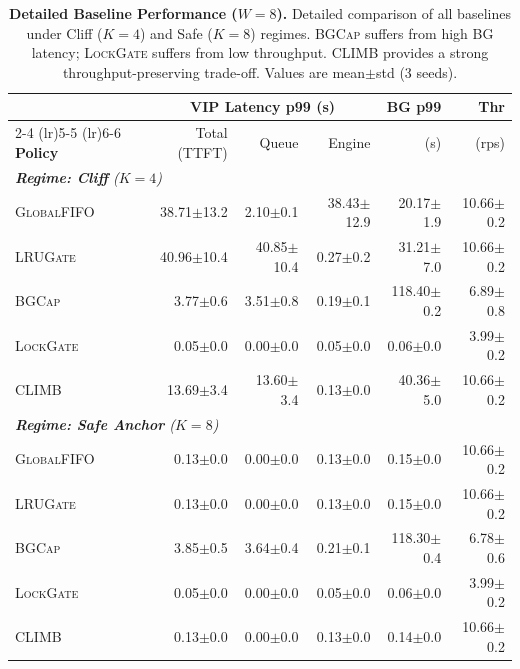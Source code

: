 \begin{table}[h] %
  \centering
  \small
  \setlength{\tabcolsep}{5pt} %
  \caption{\textbf{Detailed Baseline Performance ($W{=}8$).} 
  Detailed comparison of all baselines under Cliff ($K{=}4$) and Safe ($K{=}8$) regimes. 
  \textsc{BGCap} suffers from high \textsf{BG} latency; \textsc{LockGate} suffers from low throughput. 
  \textsc{CLIMB} provides a strong throughput-preserving trade-off. Values are mean$\pm$std (3 seeds).}
  \label{tab:baseline_zoo}
  \begin{tabular}{l rrr r r}
    \toprule
    & \multicolumn{3}{c}{\textbf{\textsf{VIP} Latency p99 (s)}} & \textbf{\textsf{BG} p99} & \textbf{Thr} \\
    \cmidrule(lr){2-4} \cmidrule(lr){5-5} \cmidrule(lr){6-6}
    \textbf{Policy} & Total (TTFT) & Queue & Engine & (s) & (rps) \\
    \midrule
    \multicolumn{6}{l}{\textit{\textbf{Regime: Cliff} ($K{=}4$)}} \\
    \textsc{GlobalFIFO}      & 38.71$\pm$13.2 &  2.10$\pm$0.1 & 38.43$\pm$12.9 &  20.17$\pm$1.9 & 10.66$\pm$0.2 \\
    \textsc{LRUGate} & 40.96$\pm$10.4 & 40.85$\pm$10.4&  0.27$\pm$0.2  &  31.21$\pm$7.0 & 10.66$\pm$0.2 \\
    \textsc{BGCap}    &  3.77$\pm$0.6  &  3.51$\pm$0.8 &  0.19$\pm$0.1  & 118.40$\pm$0.2 &  6.89$\pm$0.8 \\
    \textsc{LockGate}   &  0.05$\pm$0.0  &  0.00$\pm$0.0 &  0.05$\pm$0.0  &   0.06$\pm$0.0 &  3.99$\pm$0.2 \\
    \textsc{CLIMB}     & 13.69$\pm$3.4  & 13.60$\pm$3.4 &  0.13$\pm$0.0  &  40.36$\pm$5.0 & 10.66$\pm$0.2 \\
    \midrule
    \multicolumn{6}{l}{\textit{\textbf{Regime: Safe Anchor} ($K{=}8$)}} \\
    \textsc{GlobalFIFO}      &  0.13$\pm$0.0  &  0.00$\pm$0.0 &  0.13$\pm$0.0  &   0.15$\pm$0.0 & 10.66$\pm$0.2 \\
    \textsc{LRUGate} &  0.13$\pm$0.0  &  0.00$\pm$0.0 &  0.13$\pm$0.0  &   0.15$\pm$0.0 & 10.66$\pm$0.2 \\
    \textsc{BGCap}    &  3.85$\pm$0.5  &  3.64$\pm$0.4 &  0.21$\pm$0.1  & 118.30$\pm$0.4 &  6.78$\pm$0.6 \\
    \textsc{LockGate}   &  0.05$\pm$0.0  &  0.00$\pm$0.0 &  0.05$\pm$0.0  &   0.06$\pm$0.0 &  3.99$\pm$0.2 \\
    \textsc{CLIMB}     &  0.13$\pm$0.0  &  0.00$\pm$0.0 &  0.13$\pm$0.0  &   0.14$\pm$0.0 & 10.66$\pm$0.2 \\
    \bottomrule
  \end{tabular}
\end{table}
